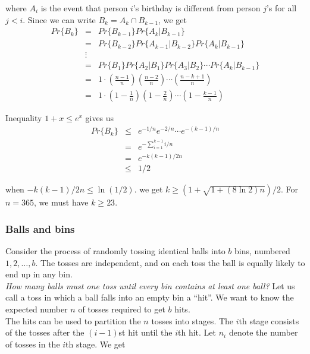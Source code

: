 \documentclass[12pt]{article}
\begin{document}
where $A_i$ is the event that person $i$'s birthday is different from person $j$'s for all $j < i$. Since we can write $B_k = A_k \cap B_{k-1}$, we get
\begin{eqnarray*}
  Pr \{ B_k \} 
  &=& Pr \{ B_{k-1} \} Pr \{ A_k | B_{k-1} \} \\
  &=& Pr \{ B_{k-2} \} Pr \{ A_{k-1} | B_{k-2} \} Pr \{ A_{k} | B_{k-1} \} \\
  &\vdots& \\
  &=& Pr \{ B_{1} \} Pr \{ A_{2} | B_{1} \} Pr \{ A_{3} | B_{2} \} \cdots
      Pr \{ A_{k} | B_{k-1} \} \\
  &=& 1 \cdot \left( \frac {n-1}{n} \right) \left( \frac {n-2}{n} \right)
      \cdots \left( \frac {n-k+1}{n} \right) \\
  &=& 1 \cdot \left( 1 - \frac {1}{n} \right) \left( 1 - \frac {2}{n} \right)
      \cdots \left( 1 - \frac {k-1}{n} \right)
\end{eqnarray*}

Inequality $1 + x \le e^x$ gives us
\begin{eqnarray*}
  Pr \{ B_k \} 
  &\le& e^{-1/n} e^{-2/n} \cdots e^{-(k-1)/n} \\
  &=& e^{- \sum_{i=1}^{k-1} i/n} \\
  &=& e^{-k(k-1)/2n} \\
  &\le& 1/2
\end{eqnarray*}

when $-k(k-1)/2n \le \ln(1/2)$. we get $k \ge (1 + \sqrt {1 + (8 \ln 2)n})/2$. For $n = 365$, we must have $k \ge 23$.

\subsubsection{Balls and bins}

Consider the process of randomly tossing identical balls into $b$ bins, numbered $1, 2, \dots, b$. The tosses are independent, and on each toss the ball is equally likely to end up in any bin. \\

\emph{How many balls must one toss until every bin contains at least one ball?} Let us call a toss in which a ball falls into an empty bin a ``hit''. We want to know the expected number $n$ of tosses required to get $b$ hits. \\

The hits can be used to partition the $n$ tosses into stages. The $i$th stage consists of the tosses after the $(i-1)$st hit until the $i$th hit. Let $n_i$ denote the number of tosses in the $i$th stage. We get
\end{document}
